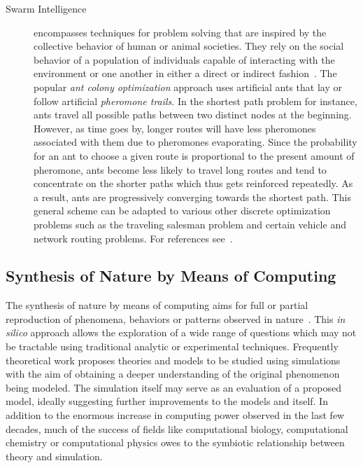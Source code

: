 \begin{description}
			\item[Swarm Intelligence] encompasses techniques for problem solving that are inspired by the collective behavior of human or animal societies. They rely on the social behavior of a population of individuals capable of interacting with the environment or one another in either a direct or indirect fashion~\cite{de2007fundamentals}. The popular \emph{ant colony optimization} approach uses artificial ants that lay or follow artificial \emph{pheromone trails}. In the shortest path problem for instance, ants travel all possible paths between two distinct nodes at the beginning. However, as time goes by, longer routes will have less pheromones associated with them due to pheromones evaporating. Since the probability for an ant to choose a given route is proportional to the present amount of pheromone, ants become less likely to travel long routes and tend to concentrate on the shorter paths which thus gets reinforced repeatedly. As a result, ants are progressively converging towards the shortest path. This general scheme can be adapted to various other discrete optimization problems such as the traveling salesman problem and certain vehicle and network routing problems. For references see~\cite{bonabeau2000swarm,bonabeau2000inspiration,Bonabeau:1999:SIN:328320,fukuyama2008fundamentals}.
			
		\end{description}

		\FloatBarrier

	\subsection{Synthesis of Nature by Means of Computing}
		
		The synthesis of nature by means of computing aims for full or partial reproduction of phenomena, behaviors or patterns observed in nature~\cite{de2007fundamentals}. This \emph{in silico} approach allows the exploration of a wide range of questions which may not be tractable using traditional analytic or experimental techniques. Frequently theoretical work proposes theories and models to be studied using simulations with the aim of obtaining a deeper understanding of the original phenomenon being modeled. The simulation itself may serve as an evaluation of a proposed model, ideally suggesting further improvements to the models and itself. In addition to the enormous increase in computing power observed in the last few decades, much of the success of fields like computational biology, computational chemistry or computational physics owes to the symbiotic relationship between theory and simulation.


